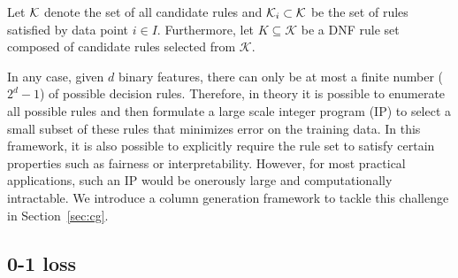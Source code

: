 \documentclass[twoside,11pt]{article}
\begin{document}
Let $\mathcal{K}$ denote the set of all candidate rules and $\mathcal{K}_i\subset\mathcal{K}$ be the set of rules satisfied by data point $i\in I$. Furthermore, let $K \subseteq \mathcal{K}$  be a DNF rule set {composed of candidate rules}  selected  from $\mathcal{K}$. 


 In any case, given $d$ binary features, there can only be  at most a finite number ($2^d-1$) of possible decision rules. 
Therefore, in theory it is possible to enumerate all possible rules and then formulate a large scale integer program (IP) to select a small subset of these rules that minimizes error on the training data. 
In this framework, it is also possible to explicitly require the rule set to satisfy certain properties such as fairness or interpretability.
However, for most practical applications, such an IP would be onerously large and computationally intractable. We introduce a column generation framework to tackle this challenge in Section~\ref{sec:cg}.



 \subsection{0-1 loss} \label{sec:01}
  
\end{document}
